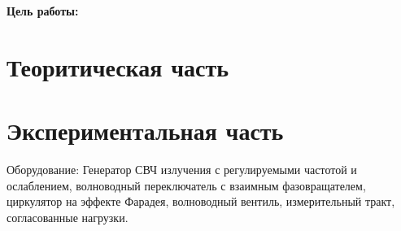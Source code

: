 
\newcommand{\vH}{\textbf{H}}
\newcommand{\vE}{\textbf{E}}
\newcommand{\vB}{\textbf{B}}
\newcommand{\vD}{\textbf{D}}
\newcommand{\vr}{\textbf{r}}
\newcommand{\vj}{\textbf{j}}
\newcommand{\vk}{\textbf{k}}
\newcommand{\vx}{\textbf{x}}
\newcommand{\vy}{\textbf{y}}
\newcommand{\vz}{\textbf{z}}


\def\labauthors{Карусевич А.А., Шиков А.П.}
\def\labgroup{440}
\def\labnumber{1}
\def\labtheme{Измерение статических характеристик полупроводникового диода}


\newpage

{\bfseries Цель работы:} 

\section{Теоритическая часть}

\newpage
\section{Экспериментальная часть}

Оборудование: Генератор СВЧ излучения с регулируемыми частотой и ослаблением, волноводный переключатель с взаимным
фазовращателем, циркулятор на эффекте Фарадея, волноводный вентиль, измерительный тракт, согласованные нагрузки.


